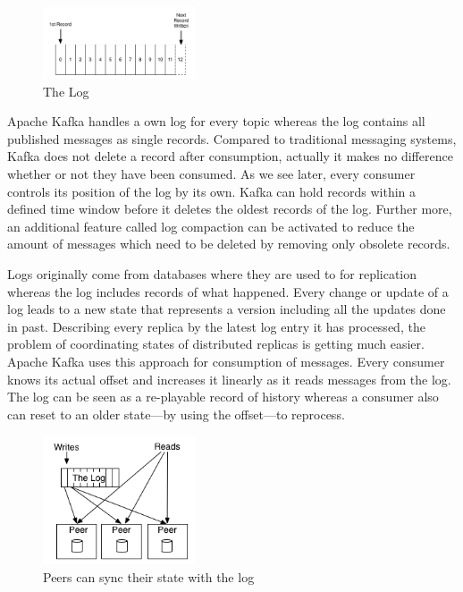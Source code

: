 \begin{figure}[H]
    \centering
    \includegraphics[width=0.4\textwidth]{images/log.png}
    \caption{The  Log \cite{JK-TheLog}}
    \label{fig:the-log}
\end{figure}

Apache Kafka handles a own log for every topic whereas the log contains all
published messages as single records. Compared to traditional messaging systems,
Kafka does not delete a record after consumption, actually it makes no difference
 whether or not they have been consumed. As we see later, every consumer
controls its position of the log by its own. Kafka can hold records within a
defined time window before it deletes the oldest records of the log.
Further more, an additional feature called log compaction can be activated to reduce the amount of messages
which need to be deleted by removing only obsolete records. \cite{apachekafka} \cite{JK-TheLog}

Logs originally come from databases where they are used to for replication
whereas the log includes records of what happened. Every change or update of a
log leads to a new state that represents a version including all the updates
done in past. Describing every replica by the latest log entry it has processed, 
the problem of coordinating states of distributed replicas is getting much easier.
Apache Kafka uses this approach for consumption of messages. Every consumer knows its actual offset and
increases it linearly as it reads messages from the log. The log can be seen as a
re-playable record of history whereas a consumer also can reset to an older
state---by using the offset---to reprocess. \cite{JK-TheLog}

\begin{figure}[H]
    \centering
    \includegraphics[width=0.4\textwidth]{images/state-machine-replication.png}
    \caption{Peers can sync their state with the log \cite{JK-TheLog}}
    \label{fig:the-log}
\end{figure}

